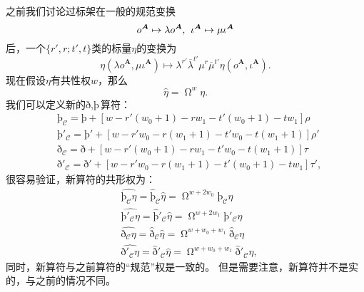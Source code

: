 之前我们讨论过标架在一般的规范变换
\begin{equation*}
	o^{\boldsymbol{A}} \mapsto \lambda o^{\boldsymbol{A}} ,\kern+0.4em \iota ^{\boldsymbol{A}} \mapsto \mu \iota ^{\boldsymbol{A}}
\end{equation*}
后，一个$\{r',r;t',t\}$类的标量$\eta $的变换为
\begin{equation*}
	\eta (\lambda o^{\boldsymbol{A}} ,\mu \iota ^{\boldsymbol{A}} )\mapsto \lambda ^{r'}\overline{\lambda }^{t'} \mu ^{r}\overline{\mu }^{t'} \eta (o^{\boldsymbol{A}} ,\iota ^{\boldsymbol{A}} ).
\end{equation*}
现在假设$\eta $有共性权$w$，那么
\begin{equation*}
	\hat{\eta } =\upOmega^{w} \eta .
\end{equation*}
我们可以定义新的$\text{ð} ,\text{þ}$算符：
\begin{equation*}
	\begin{aligned}
		& \text{þ}_{\mathcal{C}} =\text{þ}+[ w-r'( w_{0} +1) -rw_{1} -t'( w_{0} +1) -tw_{1}] \rho \\
		& \text{þ}'_{\mathcal{C}} =\text{þ}'+[ w-r'w_{0} -r( w_{1} +1) -t'w_{0} -t( w_{1} +1)] \rho '\\
		& \text{ð} _{\mathcal{C}} =\text{ð} +[ w-r'( w_{0} +1) -rw_{1} -t'w_{0} -t( w_{1} +1)] \tau \\
		& \text{ð} '_{\mathcal{C}} =\text{ð} '+[ w-r'w_{0} -r( w_{1} +1) -t'( w_{0} +1) -tw_{1}] \tau ',
	\end{aligned}
\end{equation*}
很容易验证，新算符的共形权为：
\begin{equation*}
	\begin{aligned}
		& \widehat{\text{þ}_{\mathcal{C}} \eta } =\hat{\text{þ}}_{\mathcal{C}}\hat{\eta } =\upOmega^{w+2w_{0}} \text{þ}_{\mathcal{C}} \eta \\
		& \widehat{\text{þ}'_{\mathcal{C}} \eta } =\hat{\text{þ}} '_{\mathcal{C}}\hat{\eta } =\upOmega^{w+2w_{1}} \text{þ}'_{\mathcal{C}} \eta \\
		& \widehat{\text{ð} _{\mathcal{C}} \eta } =\hat{\text{ð} }_{\mathcal{C}}\hat{\eta } =\upOmega^{w+w_{0} +w_{1}}\hat{\text{ð} }_{\mathcal{C}} \eta \\
		& \widehat{\text{ð} '_{\mathcal{C}} \eta } =\hat{\text{ð} } '_{\mathcal{C}}\hat{\eta } =\upOmega^{w+w_{0} +w_{1}}\hat{\text{ð} } '_{\mathcal{C}} \eta ,
	\end{aligned}
\end{equation*}
同时，新算符与之前算符的“规范”权是一致的。 但是需要注意，新算符并不是实的，与之前的情况不同。



